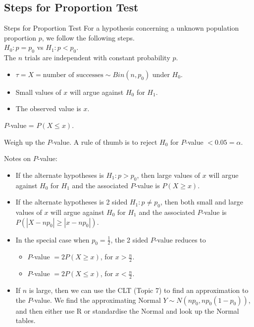 \documentclass[t,xcolor=pdftex,dvipsnames,table]{beamer}\usepackage[]{graphicx}\usepackage[]{color}
\begin{document}
\subsection[Proportion]{Steps for Proportion Test}
\begin{frame}[fragile]{Steps for Proportion Test}
For a hypothesis concerning a unknown population proportion $p$, we follow the following steps. \\

\vspace{.5cm}
 $H_{0}: p = p_{0}$ vs $H_{1}: p < p_{0}$. \\

 The $n$ trials are independent with constant probability $p$.

\begin{itemize}
\item $\tau = X =  \mbox{number of successes} \sim Bin(n,p_{0})$ under $H_{0}$. 
\item Small values of $x$ will argue against $H_{0}$ for $H_{1}$. 
\item The observed value is $x$. 
\end{itemize}

 $P$-value = $P( X \leq x)$.

 Weigh up the $P$-value. A rule of thumb is to reject $H_{0}$ for $P$-value $< 0.05 = \alpha$.
\end{frame}  

\begin{frame}{}
Notes on $P$-value:

\begin{itemize}
\item If the alternate hypotheses is $H_{1}: p > p_{0}$, then large values of $x$ will argue against $H_{0}$ for $H_{1}$ and the associated $P$-value is $P( X \geq x)$. 
\item If the alternate hypotheses is 2 sided $H_{1}: p \neq p_{0}$, then both small and large values of $x$ will argue against $H_{0}$ for $H_{1}$ and the associated $P$-value is $P( |X-n p_{0}| \geq |x-n p_{0}|)$.
\item In the special case when $p_{0} = \frac{1}{2}$, the 2 sided $P$-value reduces to
\begin{itemize}
\item $P$-value $= 2P( X \geq x)$, for $x > \frac{n}{2}$.
\item $P$-value $= 2P( X \leq x)$, for $x < \frac{n}{2}$.
\end{itemize}
\item If $n$ is large, then we can use the CLT (Topic 7) to find an approximation to the $P$-value. We find the approximating Normal $Y \sim N(n p_{0}, n p_{0} (1-p_{0}))$, and then either use R or standardise the Normal and look up the Normal tables.
\end{itemize}
\end{frame}
\end{document}
